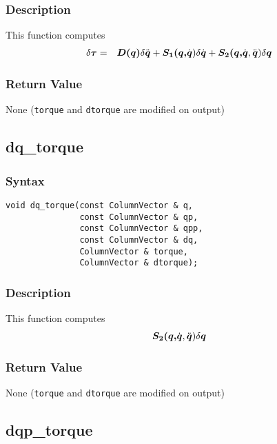 \documentclass[dvips,11pt,fleqn]{report}
\newcommand{\mbold}[1]{\mbox{\boldmath $ #1 $}}
\begin{document}
\subsubsection*{Description}
This function computes 
\begin{eqnarray}
\delta \mbold{\tau} & = & \mbold{D(q)} \delta \ddot{\mbold{q}} 
+ \mbold{S_1(q,}\dot{\mbold{q}}) \delta \dot{\mbold{q}}
+ \mbold{S_2(q,}\dot{\mbold{q}},\ddot{\mbold{q}}) \delta \mbold{q}
\end{eqnarray}


\subsubsection*{Return Value}

None ({\tt torque} and {\tt dtorque} are modified on output)

\newpage

\subsection*{dq\_torque}
\subsubsection*{Syntax}
\begin{verbatim}
void dq_torque(const ColumnVector & q, 
               const ColumnVector & qp,
               const ColumnVector & qpp, 
               const ColumnVector & dq,
               ColumnVector & torque, 
               ColumnVector & dtorque);
\end{verbatim}
\subsubsection*{Description}
This function computes 
\begin{eqnarray}
\mbold{S_2(q,}\dot{\mbold{q}},\ddot{\mbold{q}}) \delta \mbold{q}
\end{eqnarray}


\subsubsection*{Return Value}

None ({\tt torque} and {\tt dtorque} are modified on output)

\newpage
\subsection*{dqp\_torque}
\end{document}
